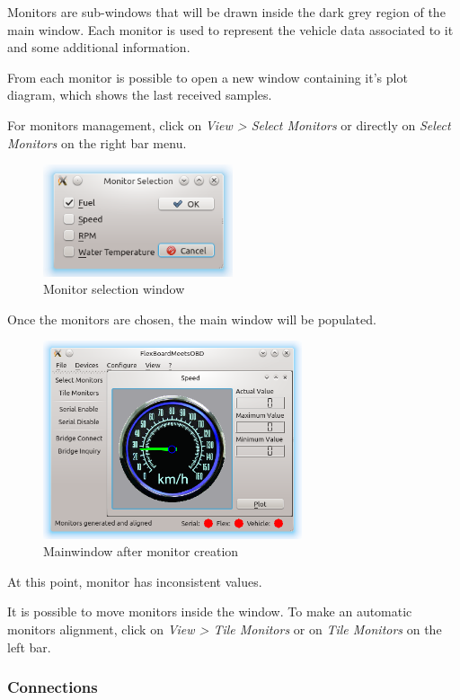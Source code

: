 \documentclass[twoside]{article}
\begin{document}
\begin{multicols}{2}
Monitors are sub-windows that will be drawn inside the dark grey region of the main window. Each monitor is used to represent the vehicle data associated to it and some additional information.

From each monitor is possible to open a new window containing it's plot diagram, which shows the last received samples.

For monitors management, click on \emph{View > Select Monitors} or directly on \emph{Select Monitors} on the right bar menu.

\begin{figure}[H]
  \centering
  \includegraphics[width=2.2in]{img/GUI/monitor_selection}
  \caption{Monitor selection window}
\end{figure}

Once the monitors are chosen, the main window will be populated.

\begin{figure}[H]
  \centering
  \includegraphics[width=3in]{img/GUI/monitor_created}
  \caption{Mainwindow after monitor creation}
\end{figure}

At this point, monitor has inconsistent values.

It is possible to move monitors inside the window. To make an automatic monitors alignment, click on \emph{View > Tile Monitors} or on \emph{Tile Monitors} on the left bar.

\subsubsection{Connections}


\end{multicols}
\end{document}
